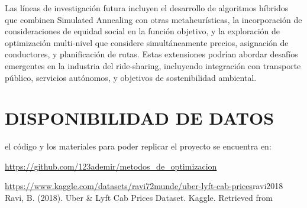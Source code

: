 \documentclass[conference]{IEEEtran}
\begin{document}
Las líneas de investigación futura incluyen el desarrollo de algoritmos híbridos que combinen Simulated Annealing con otras metaheurísticas, la incorporación de consideraciones de equidad social en la función objetivo, y la exploración de optimización multi-nivel que considere simultáneamente precios, asignación de conductores, y planificación de rutas. Estas extensiones podrían abordar desafíos emergentes en la industria del ride-sharing, incluyendo integración con transporte público, servicios autónomos, y objetivos de sostenibilidad ambiental.

\section{DISPONIBILIDAD DE DATOS}
el código y los materiales para poder replicar el proyecto se encuentra en:

\url{https://github.com/123ademir/metodos_de_optimizacion}

\url{https://www.kaggle.com/datasets/ravi72munde/uber-lyft-cab-prices}{ravi2018} Ravi, B. (2018). Uber \& Lyft Cab Prices Dataset. Kaggle. Retrieved from
\end{document}
